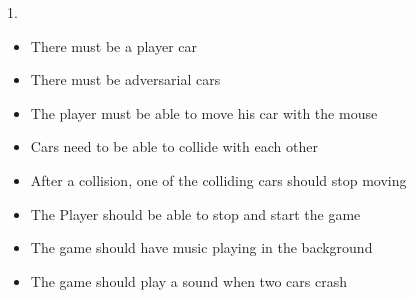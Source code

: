 \documentclass[11pt,a4paper]{article}
\begin{document}
\thispagestyle{empty}
\pagestyle{empty}

1. \begin{itemize}
\item There must be a player car
\item There must be adversarial cars
\item The player must be able to move his car with the mouse
\item Cars need to be able to collide with each other
\item After a collision, one of the colliding cars should stop moving
\item The Player should be able to stop and start the game
\item The game should have music playing in the background
\item The game should play a sound when two cars crash
\end{itemize}
\end{document}
